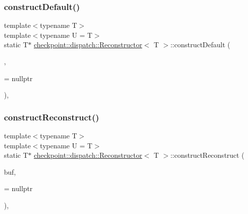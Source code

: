 \mbox{\label{structcheckpoint_1_1dispatch_1_1_reconstructor_abbdc865e73cc1a41a816525d1bd5f507}} 
\subsubsection{\texorpdfstring{construct\+Default()}{constructDefault()}\hspace{0.1cm}{\footnotesize\ttfamily [2/2]}}
{\footnotesize\ttfamily template$<$typename T$>$ \\
template$<$typename U  = T$>$ \\
static T$\ast$ \hyperlink{structcheckpoint_1_1dispatch_1_1_reconstructor}{checkpoint\+::dispatch\+::\+Reconstructor}$<$ T $>$\+::construct\+Default (\begin{DoxyParamCaption}\item[{void $\ast$}]{,  }\item[{\hyperlink{namespacecheckpoint_a4032c86e7c92702198dd675a2696ee2c}{is\+Not\+Default\+Cons\+Type}$<$ U $>$ $\ast$}]{ = {\ttfamily nullptr} }\end{DoxyParamCaption})\hspace{0.3cm}{\ttfamily [inline]}, {\ttfamily [static]}}

\mbox{\label{structcheckpoint_1_1dispatch_1_1_reconstructor_a86a95e9ca24e30a627ed6626f19db4a2}} 
\subsubsection{\texorpdfstring{construct\+Reconstruct()}{constructReconstruct()}\hspace{0.1cm}{\footnotesize\ttfamily [1/4]}}
{\footnotesize\ttfamily template$<$typename T$>$ \\
template$<$typename U  = T$>$ \\
static T$\ast$ \hyperlink{structcheckpoint_1_1dispatch_1_1_reconstructor}{checkpoint\+::dispatch\+::\+Reconstructor}$<$ T $>$\+::construct\+Reconstruct (\begin{DoxyParamCaption}\item[{void $\ast$}]{buf,  }\item[{\hyperlink{namespacecheckpoint_a126da7cae6bbbec231bb2552dc3ad6cc}{is\+Reconstructible\+Type}$<$ U $>$ $\ast$}]{ = {\ttfamily nullptr} }\end{DoxyParamCaption})\hspace{0.3cm}{\ttfamily [inline]}, {\ttfamily [static]}}

